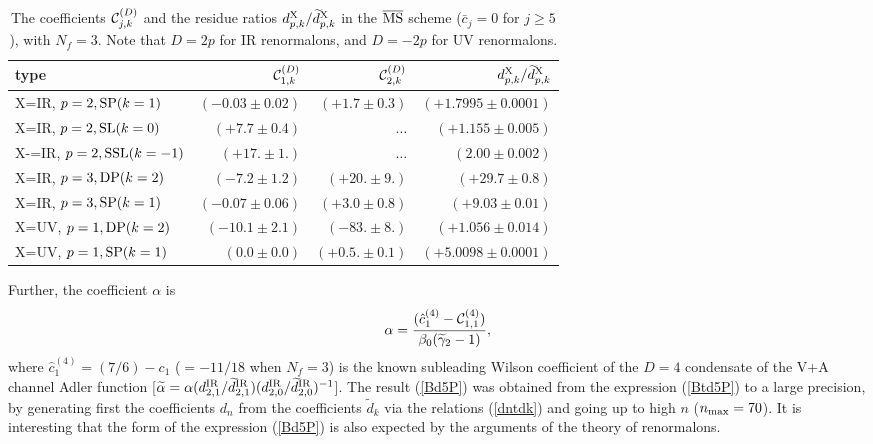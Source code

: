 \documentclass[aps,nofootinbib,showkeys,noshowpacs,preprintnumbers,amsmath,amssymb]{revtex4}
\def\be{\begin{equation}}
\def\ee{\end{equation}}
\newcommand{\td}{{\widetilde d}}
\newcommand{\tg}{{\widetilde {\gamma}}}
\newcommand{\MSbar}{\overline{\rm MS}}
\begin{document}
\begin{table}
  \caption{The coefficients ${\cal C}^{(D)}_{j,k}$ and the residue ratios $d^{\rm X}_{p,k}/\td^{\rm X}_{p,k}$ in the $\MSbar$ scheme (${\bar c}_j=0$ for $j \geq 5$), with $N_f=3$. Note that $D=2 p$ for IR renormalons, and $D=-2 p$ for UV renormalons.}
\label{tabCd}
\begin{ruledtabular}
\begin{tabular}{l|rrr}
  type &  ${\cal C}^{(D)}_{1,k}$ & ${\cal C}^{(D)}_{2,k}$ & $d_{p,k}^{\rm X}/\td_{p,k}^{\rm X}$
\\
\hline
X=IR, $p=2, {\rm SP}(k=1)$ &  $(-0.03 \pm 0.02)$ & $(+1.7 \pm 0.3)$ & $(+1.7995 \pm 0.0001)$ 
\\
X=IR, $p=2, {\rm SL}(k=0)$ &  $(+7.7 \pm 0.4)$ & $\dots$ & $(+1.155 \pm 0.005)$  
\\
X-=IR, $p=2, {\rm SSL}(k=-1)$ & $(+17. \pm 1.)$ & $\ldots$ & $(2.00 \pm 0.002)$
\\
\hline
X=IR, $p=3, {\rm DP}(k=2)$ & $(-7.2 \pm 1.2)$ & $(+20. \pm 9.)$ & $(+29.7 \pm 0.8)$ 
\\
X=IR, $p=3, {\rm SP}(k=1)$ & $(-0.07 \pm 0.06)$ & $(+3.0 \pm 0.8)$ & $(+9.03 \pm 0.01)$ 
\\
\hline
X=UV, $p=1, {\rm DP}(k=2)$ & $(-10.1 \pm 2.1)$ & $(-83. \pm 8.)$ & $(+1.056 \pm 0.014)$
\\
X=UV, $p=1, {\rm SP}(k=1)$ & $(0.0 \pm 0.0)$ & $(+0.5. \pm 0.1)$ & $(+5.0098 \pm 0.0001)$
\end{tabular}
\end{ruledtabular}
\end{table}
Further, the coefficient $\alpha$ is
\be
\alpha =\frac{ ({\hat c}_1^{(4)} - {\cal C}_{1,1}^{(4)}) }{\beta_0 (\tg_2 -1)},
\label{al}
\ee
where ${\hat c}_1^{(4)}=(7/6)-c_1$ ($=-11/18$ when $N_f=3$) is the known subleading Wilson coefficient of the $D=4$ condensate of the V+A channel Adler function [${\widetilde \alpha} = \alpha (d_{2,1}^{\rm IR}/\td_{2,1}^{\rm IR}) (d_{2,0}^{\rm IR}/\td_{2,0}^{\rm IR})^{-1}$]. The result (\ref{Bd5P}) was obtained from the expression (\ref{Btd5P}) to a large precision, by generating first the coefficients $d_n$ from the coefficients $\td_k$ via the relations (\ref{dntdk}) and going up to high $n$ ($n_{\rm max}=70$). It is interesting that the form of the expression (\ref{Bd5P}) is also expected by the arguments of the theory of renormalons.
\end{document}

